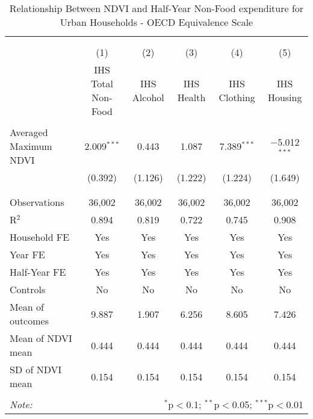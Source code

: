 
\begin{table}[!htbp] \centering 
  \caption{Relationship Between NDVI and Half-Year Non-Food expenditure for Urban Households - OECD Equivalence Scale} 
  \label{ndvi_table_7_1_urban.tex} 
\normalsize 
\begin{tabular}{@{\extracolsep{5pt}}lccccc} 
\\[-1.8ex]\hline 
\hline \\[-1.8ex] 
\\[-1.8ex] & (1) & (2) & (3) & (4) & (5)\\ 
 & IHS Total Non-Food & IHS Alcohol & IHS Health & IHS Clothing & IHS Housing \\ 
\hline \\[-1.8ex] 
 Averaged Maximum NDVI & 2.009$^{***}$ & 0.443 & 1.087 & 7.389$^{***}$ & $-$5.012$^{***}$ \\ 
  & (0.392) & (1.126) & (1.222) & (1.224) & (1.649) \\ 
  & & & & & \\ 
\hline \\[-1.8ex] 
Observations & 36,002 & 36,002 & 36,002 & 36,002 & 36,002 \\ 
R$^{2}$ & 0.894 & 0.819 & 0.722 & 0.745 & 0.908 \\ 
Household FE & Yes & Yes & Yes & Yes & Yes \\ 
Year FE & Yes & Yes & Yes & Yes & Yes \\ 
Half-Year FE & Yes & Yes & Yes & Yes & Yes \\ 
Controls & No & No & No & No & No \\ 
Mean of outcomes & 9.887 & 1.907 & 6.256 & 8.605 & 7.426 \\ 
Mean of NDVI mean & 0.444 & 0.444 & 0.444 & 0.444 & 0.444 \\ 
SD of NDVI mean & 0.154 & 0.154 & 0.154 & 0.154 & 0.154 \\ 
\hline \\[-1.8ex] 
\textit{Note:}  & \multicolumn{5}{r}{$^{*}$p$<$0.1; $^{**}$p$<$0.05; $^{***}$p$<$0.01} \\ 
\end{tabular} 
\end{table} 

